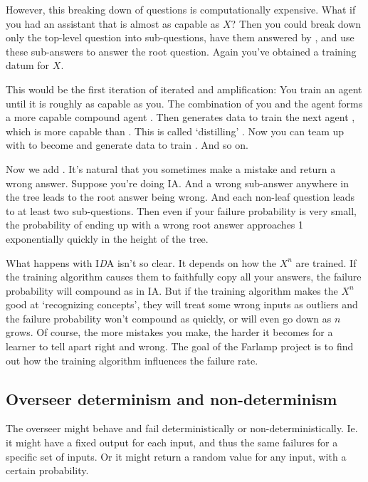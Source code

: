 \documentclass{farlamp}
\begin{document}
However, this breaking down of questions is computationally expensive. What if
you had an assistant  that is almost as capable as $X$? Then you could
break down only the top-level question into sub-questions, have them answered by
, and use these sub-answers to answer the root question. Again you've
obtained a training datum for $X$.

This would be the first iteration of iterated  and
amplification: You train an agent  until it is roughly as capable as you.
The combination of you and the agent forms a more capable compound agent
. Then  generates data to train the next agent , which is
more capable than . This is called ‘distilling’ . Now you can team
up with  to become  and generate data to train . And so on.

Now we add . It's natural that you sometimes make a mistake and
return a wrong answer. Suppose you're doing IA. And a wrong sub-answer anywhere
in the tree leads to the root answer being wrong. And each non-leaf question
leads to at least two sub-questions. Then even if your failure probability is
very small, the probability of ending up with a wrong root answer approaches 1
exponentially quickly in the height of the tree.~\parencite{ChriRelAmp}

What happens with I\emph{D}A isn't so clear. It depends on how the $X^n$ are
trained. If the training algorithm causes them to faithfully copy all your
answers, the failure probability will compound as in IA. But if the training
algorithm makes the $X^n$ good at ‘recognizing concepts’, they will treat some
wrong inputs as outliers and the failure probability won't compound as quickly,
or will even go down as $n$ grows. Of course, the more mistakes you make, the
harder it becomes for a learner to tell apart right and wrong. The goal of the
Farlamp project is to find out how the training algorithm influences the failure
rate.


\subsection{Overseer determinism and non-determinism}

The overseer might behave and fail deterministically or non-deterministically.
Ie. it might have a fixed output for each input, and thus the same failures for
a specific set of inputs. Or it might return a random value for any input,
with a certain probability.
\end{document}
